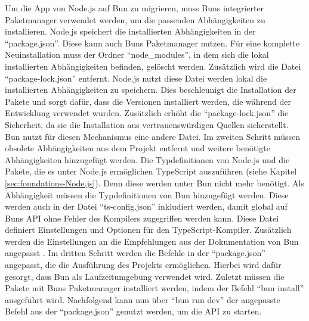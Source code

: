 \noindent
Um die App von Node.js auf Bun zu migrieren, muss Buns integrierter Paketmanager verwendet werden, um die passenden Abhängigkeiten zu installieren. Node.js speichert die installierten Abhängigkeiten in der ``package.json''. Diese kann auch Buns Paketmanager nutzen. Für eine komplette Neuinstallation muss der Ordner ``node\_modules'', in dem sich die lokal installierten Abhängigkeiten befinden,  gelöscht werden. Zusätzlich wird die Datei ``package-lock.json'' entfernt. Node.js nutzt diese Datei werden lokal die installierten Abhängigkeiten zu speichern. Dies beschleunigt die Installation der Pakete und sorgt dafür, dass die Versionen installiert werden, die während der Entwicklung verwendet wurden. Zusätzlich erhöht die ``package-lock.json'' die Sicherheit, da sie die Installation aus vertrauenswürdigen Quellen sicherstellt. Bun nutzt für diesen Mechanismus eine andere Datei. \newline
Im zweiten Schritt müssen obsolete Abhängigkeiten aus dem Projekt entfernt und weitere benötigte Abhängigkeiten hinzugefügt werden. Die Typdefinitionen von Node.js und die Pakete, die es unter Node.js ermöglichen TypeScript auszuführen (siehe Kapitel \ref{sec:foundations-Node.js}). Denn diese werden unter Bun nicht mehr benötigt. Als Abhängigkeit müssen die Typdefinitionen von Bun hinzugefügt werden. Diese werden auch in der Datei ``ts-config.json'' inkludiert werden, damit global auf Buns API ohne Fehler des Kompilers zugegriffen werden kann. Diese Datei definiert Einstellungen und Optionen für den TypeScript-Kompiler. Zusätzlich werden die Einstellungen an die Empfehlungen aus der Dokumentation von Bun angepasst . \newline 
Im dritten Schritt werden die Befehle in der ``package.json'' angepasst, die die Ausführung des Projekts ermöglichen. Hierbei wird dafür gesorgt, dass Bun als Laufzeitumgebung verwendet wird. Zuletzt müssen die Pakete mit Buns Paketmanager installiert werden, indem der Befehl ``bun install'' ausgeführt wird. Nachfolgend kann nun über ``bun run dev'' der angepasste Befehl aus der ``package.json'' genutzt werden, um die API zu starten.\\

